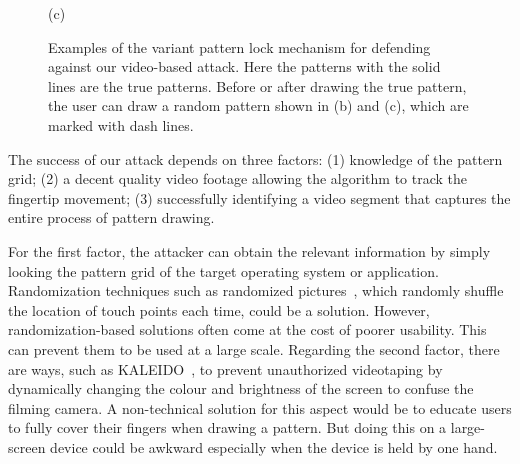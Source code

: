 \begin{figure}[!t]
{\begin{minipage}[t]{0.11\textwidth}
                \centering \footnotesize (c)
             \end{minipage}
        }
        \caption{Examples of the variant pattern lock mechanism for defending against our video-based attack. Here the patterns with the solid lines are the true patterns.
        Before or after drawing the true pattern, the user can draw a random pattern shown in (b) and (c), which are marked with dash lines.
        }
        \label{fig:protection}
    \end{figure}



The success of our attack depends on three factors: (1)
knowledge of the pattern grid; (2) a decent
quality video footage allowing the algorithm to track the fingertip movement;
(3) successfully identifying a video segment that captures the entire process of pattern drawing.

For the first factor, the attacker can obtain the relevant information by simply looking the pattern grid
of the target operating system or application.
Randomization techniques such as
randomized pictures~\cite{biddle2012graphical,hossein2015fortifying}, which randomly shuffle the location
of touch points each time, could be a solution.
However, randomization-based solutions often come at the cost of poorer
usability. This can prevent them to be used at a large scale.
Regarding the second factor, there are ways, such as
KALEIDO~\cite{zhang2015kaleido}, to prevent unauthorized videotaping by
dynamically changing the colour and brightness of the screen to confuse the
filming camera. A non-technical solution for this aspect would be to educate users to
fully cover their fingers when drawing a pattern. But doing this on a large-screen device could be awkward especially when the device is held by one hand.



